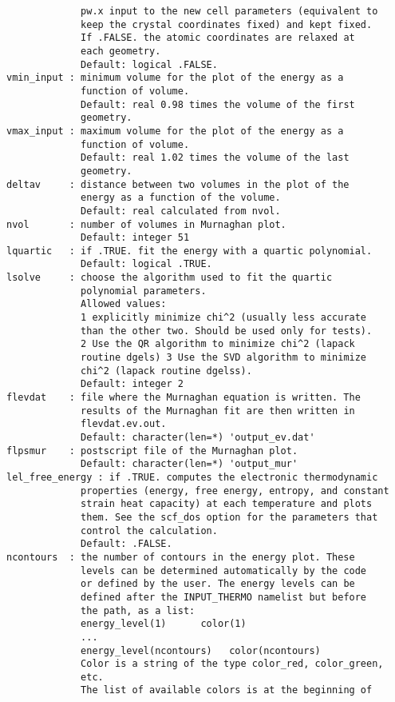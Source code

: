 \documentclass[12pt,a4paper,twoside]{report}
\begin{document}
\begin{verbatim}
             pw.x input to the new cell parameters (equivalent to 
             keep the crystal coordinates fixed) and kept fixed. 
             If .FALSE. the atomic coordinates are relaxed at 
             each geometry.
             Default: logical .FALSE.
vmin_input : minimum volume for the plot of the energy as a 
             function of volume.
             Default: real 0.98 times the volume of the first 
             geometry.
vmax_input : maximum volume for the plot of the energy as a 
             function of volume.
             Default: real 1.02 times the volume of the last 
             geometry.
deltav     : distance between two volumes in the plot of the 
             energy as a function of the volume.
             Default: real calculated from nvol.
nvol       : number of volumes in Murnaghan plot.
             Default: integer 51
lquartic   : if .TRUE. fit the energy with a quartic polynomial.
             Default: logical .TRUE.
lsolve     : choose the algorithm used to fit the quartic 
             polynomial parameters.
             Allowed values:
             1 explicitly minimize chi^2 (usually less accurate 
             than the other two. Should be used only for tests).
             2 Use the QR algorithm to minimize chi^2 (lapack 
             routine dgels) 3 Use the SVD algorithm to minimize 
             chi^2 (lapack routine dgelss).
             Default: integer 2
flevdat    : file where the Murnaghan equation is written. The 
             results of the Murnaghan fit are then written in 
             flevdat.ev.out.
             Default: character(len=*) 'output_ev.dat'
flpsmur    : postscript file of the Murnaghan plot.
             Default: character(len=*) 'output_mur'
lel_free_energy : if .TRUE. computes the electronic thermodynamic 
             properties (energy, free energy, entropy, and constant 
             strain heat capacity) at each temperature and plots 
             them. See the scf_dos option for the parameters that 
             control the calculation.
             Default: .FALSE.
ncontours  : the number of contours in the energy plot. These 
             levels can be determined automatically by the code 
             or defined by the user. The energy levels can be 
             defined after the INPUT_THERMO namelist but before 
             the path, as a list:
             energy_level(1)      color(1)
             ...
             energy_level(ncontours)   color(ncontours) 
             Color is a string of the type color_red, color_green, 
             etc.
             The list of available colors is at the beginning of 

\end{verbatim}
\end{document}
